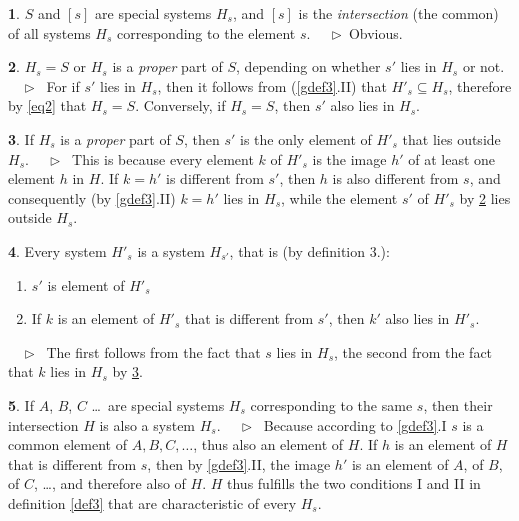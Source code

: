 \documentclass[leqno,hidelinks]{article}
\theoremstyle{definition}
\newtheorem{satz}{\protect\satzname}
\newcommand{\satzname}{}
\renewcommand{\satzname}{\hspace{-4pt}.\ Satz}%
\renewcommand{\satzname}{\hspace{-4pt}.\ Theorem}%
\newcommand\Beweis{\medskip \newline $ \phantom{'.'} \rhd \ $}%
\newcommand\beweis{ $ \phantom{'.'} \rhd \ $}%
\newcommand{\partof}{\subseteq}
\newcommand{\sref}[1]{\underline{\ref{#1}}}%
\begin{document}
\begin{paracol}{2}
\begin{satz}\label{thm4}
$S$ and $[s]$ are special systems $H_s$, and $[s]$ is the \emph{intersection}
(the common) of all systems $H_s$ corresponding to the element $s$.
\Beweis Obvious. \end{satz}

\begin{satz}\label{thm5}
$H_s = S$ or $H_s$ is a \textit{proper} part of $S$, depending on whether
$s'$ lies in $H_s$ or not.
\Beweis
For if $s'$ lies in $H_s$, then it follows from (\sref{gdef3}{\color{ultrav}.II)}
that $H'_s \partof H_s$, therefore by \eqref{eq2} that $H_s = S$. Conversely,
if $H_s = S$, then $s'$ also lies in $H_s$.
\end{satz}

\begin{satz}\label{thm6}
If $H_s$ is a \emph{proper} part of $S$, then $s'$ is the only element of
$H'_s$ that lies outside $H_s$.
\Beweis
This is because every element $k$ of $H'_s$ is the image $h'$ of at least one
element $h$ in $H$. If $k=h'$ is different from $s'$, then $h$ is also different
from $s$, and consequently (by \sref{gdef3}{\color{ultrav}.II)} $k = h'$ lies in
$H_s$, while the element $s'$ of $H'_s$ by \sref{thm5} lies outside $H_s$.
\end{satz}

\begin{satz}\label{thm7}
Every system $H'_s$ is a system $H_{s'}$, that is (by definition 3.):
\begin{enumerate}[I'.]
	\item $s'$ is element of $H'_s$
	\item If $k$ is an element of $H'_s$ that is different from $s'$, then $k'$
    also lies in $H'_s$.
\end{enumerate}
\beweis
The first follows from the fact that $s$ lies in $H_s$, the second from the fact
that $k$ lies in $H_s$ by \sref{thm6}.
\end{satz}

\begin{satz}\label{thm8}
If $A$, $B$, $C$ \ldots\ are special systems $H_s$ corresponding to the same $s$,
then their intersection $H$ is also a system $H_s$.
\Beweis
Because according to \sref{gdef3}{\color{ultrav}.I} $s$ is a common element of
$A, B, C, \ldots$, thus also an element of $H$. If $h$ is an element of $H$ that
is different from $s$, then by \sref{gdef3}{\color{ultrav}.II}, the image $h'$
is an element of $A$, of $B$, of $C$, \ldots, and therefore also of $H$. $H$ thus
fulfills the two conditions I and II in definition \sref{def3} that are
characteristic of every $H_s$.
\end{satz}


\end{paracol}
\end{document}
